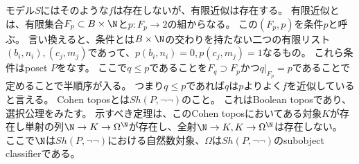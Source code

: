 \documentclass[uplatex]{jsarticle}
\begin{document}
モデル$S$にはそのような$f$は存在しないが、有限近似は存在する。
有限近似とは、有限集合$F_p\subset B\times \N$と$p\colon F_p\to 2$の組からなる。
この$(F_p,p)$を条件$p$と呼ぶ。
言い換えると、条件とは$B\times\N$の交わりを持たない二つの有限リスト$(b_i,n_i), (c_j,m_j)$であって、$p(b_i,n_i)=0, p(c_j,m_j)=1$なるもの。
これら条件はposet $P$をなす。
ここで$q\leq p$であることを$F_q\supset F_p$かつ$q\vert_{F_p}=p$であることで定めることで半順序が入る。
つまり$q\leq p$であれば$q$は$p$よりよく$f$を近似していると言える。
Cohen toposとは$Sh(P, \lnot\lnot)$のこと。
これはBoolean toposであり、選択公理をみたす。
示すべき定理は、このCohen toposにおいてある対象$K$が存在し単射の列$\N\to K \to \Omega^\N$が存在し、全射$\N\to K, K\to \Omega^\N$は存在しない。
ここで$\N$は$Sh(P,\lnot\lnot)$における自然数対象、$\Omega$は$Sh(P, \lnot\lnot)$のsubobject classifierである。
\end{document}
